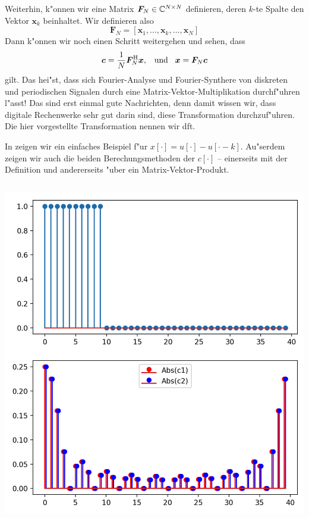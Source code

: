 Weiterhin, k"onnen wir eine Matrix $\bm F_N \in \mathbb{C}^{N \times N}$ definieren, deren $k$-te Spalte den Vektor $\bm x_k$ beinhaltet.
Wir definieren also 
\[
\bm F_N = \left[
    \bm x_1, \ldots, \bm x_k, \ldots, \bm x_N 
\right]
\]
Dann k"onnen wir noch einen Schritt weitergehen und sehen, dass
\[
\bm c = \frac{1}{N} \bm F_N^{\mathrm{H}} \bm x, {\hspace{3mm} \text{und} \hspace{3mm}} \bm x = \bm F_N \bm c
\]
gilt.
Das hei"st, dass sich Fourier-Analyse und Fourier-Synthere von diskreten und periodischen Signalen durch eine Matrix-Vektor-Multiplikation durchf"uhren l"asst!
Das sind erst einmal gute Nachrichten, denn damit wissen wir, dass digitale Rechenwerke sehr gut darin sind, diese Transformation durchzuf"uhren.
Die hier vorgestellte Transformation nennen wir \gls{dft}.

In  zeigen wir ein einfaches Beispiel f"ur $x[\cdot] = u[\cdot] - u[\cdot-k]$.
Au"serdem zeigen wir auch die beiden Berechungsmethoden der $c[\cdot]$ -- einerseits mit der Definition und andererseits "uber ein Matrix-Vektor-Produkt.
%
\begin{listing}[h]
    \noindent
    \begin{minipage}{0.51\textwidth}
        \strut\vspace*{-\baselineskip}\newline
        \inputminted[firstline=5, lastline=22]{python3}{code/dft_1.py}
    \end{minipage}%
    \begin{minipage}{0.48\textwidth}
        \strut\vspace*{-\baselineskip}\newline
        \includegraphics[width=\textwidth]{code/dft_1.png}
    \end{minipage}
    \label{py:dft_1}
\end{listing}
%
\FloatBarrier
%
